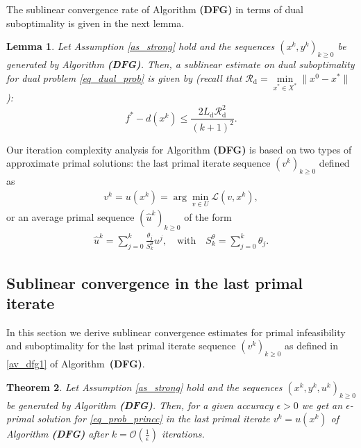 \documentclass{gOMS2e}
\theoremstyle{plain}
\newtheorem{theorem}{Theorem}[section]
\newtheorem{lemma}[theorem]{Lemma}
\theoremstyle{definition}
\theoremstyle{remark}
\begin{document}
\noindent The sublinear convergence rate of Algorithm {\bf (DFG)} in
terms of dual suboptimality is given in the next lemma.
\begin{lemma} \cite{BecTeb:14,Tse:08}
\label{th_sublin_dfg} Let Assumption \ref{as_strong} hold and the
sequences $\left(x^k, y^k\right)_{k\geq 0}$ be generated by
Algorithm {\bf (DFG)}. Then, a sublinear  estimate on dual
suboptimality for dual problem \eqref{eq_dual_prob} is given by
(recall that $\mathcal{R}_\text{d}   =
\min\limits_{x^* \in X^*} \| x^0 - x^*\|$):
\begin{equation}
\label{bound_dual_optim_dfg} f^* - d({x}^{k}) \leq \frac{2
L_\text{d} \mathcal{R}_\text{d}^2}{(k+1)^2}.
\end{equation}
\end{lemma}

\noindent Our iteration complexity analysis for Algorithm {\bf
(DFG)}  is based on two types of approximate primal solutions:  the
last primal iterate sequence $(v^k)_{k \geq 0}$ defined as
\begin{align}
\label{av_dfg1} v^k = u(x^k) =\arg \min\limits_{v \in U}
\mathcal{L}(v,x^k),
\end{align}
or an average primal sequence $(\hat u^k)_{k \geq 0}$ of the form
\begin{align}
\label{av_dfg2} \hat u^k =\sum_{j=0}^k \frac{\theta_j}{S_k^\theta}
u^j,   \quad \text{with} \quad S_k^\theta = \sum\limits_{j=0}^k
\theta_j.
\end{align}

\subsection{Sublinear convergence in the last primal iterate}
\label{sec_dfglast} \noindent In this section we derive sublinear
convergence estimates for  primal infeasibility  and suboptimality
for the last primal iterate sequence $(v^k)_{k \geq 0}$ as defined
in \eqref{av_dfg1} of Algorithm~\textbf{(DFG)}.

\begin{theorem}
\label{th_dfglast}  Let Assumption \ref{as_strong} hold and the
sequences $\left(x^k, y^k, u^k\right)_{k\geq 0}$ be generated by
Algorithm {\bf (DFG)}.  Then, for a given accuracy $\epsilon>0$ we
get an $\epsilon$-primal solution for \eqref{eq_prob_princc} in the
last primal iterate  $v^k = u(x^k)$ of Algorithm \textbf{(DFG)}
after $k = {\mathcal O} (\frac{1}{\epsilon})$ iterations.
\end{theorem}
\end{document}
